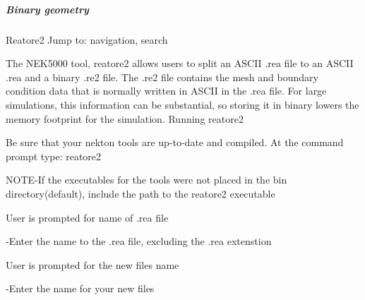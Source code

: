 \subparagraph*{Binary geometry}
 Reatore2
Jump to: navigation, search

The NEK5000 tool, reatore2 allows users to split an ASCII .rea file to an ASCII .rea and a binary .re2 file. The .re2 file contains the mesh and boundary condition data that is normally written in ASCII in the .rea file. For large simulations, this information can be substantial, so storing it in binary lowers the memory footprint for the simulation.
Running reatore2

    Be sure that your nekton tools are up-to-date and compiled.
    At the command prompt type: reatore2 

NOTE-If the executables for the tools were not placed in the bin directory(default), 
include the path to the reatore2 executable

    User is prompted for name of .rea file 

    -Enter the name to the .rea file, excluding the .rea extenstion 

    User is prompted for the new files name 

    -Enter the name for your new files 


